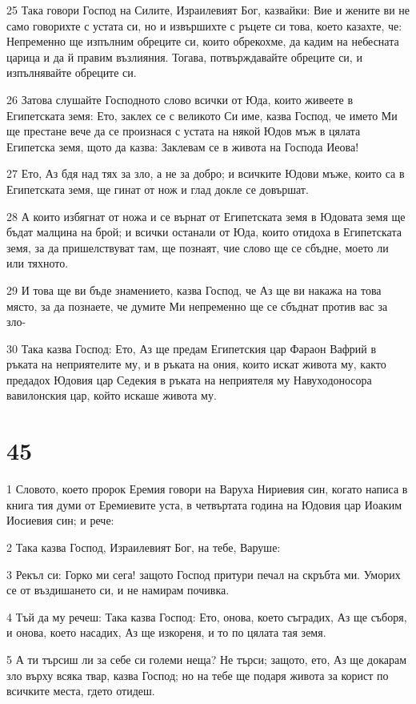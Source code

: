 \par 25 Така говори Господ на Силите, Израилевият Бог, казвайки: Вие и жените ви не само говорихте с устата си, но и извършихте с ръцете си това, което казахте, че: Непременно ще изпълним обреците си, които обрекохме, да кадим на небесната царица и да й правим възлияния. Тогава, потвърждавайте обреците си, и изпълнявайте обреците си.
\par 26 Затова слушайте Господното слово всички от Юда, които живеете в Египетската земя: Ето, заклех се с великото Си име, казва Господ, че името Ми ще престане вече да се произнася с устата на някой Юдов мъж в цялата Египетска земя, щото да казва: Заклевам се в живота на Господа Иеова!
\par 27 Ето, Аз бдя над тях за зло, а не за добро; и всичките Юдови мъже, които са в Египетската земя, ще гинат от нож и глад докле се довършат.
\par 28 А които избягнат от ножа и се върнат от Египетската земя в Юдовата земя ще бъдат малцина на брой; и всички останали от Юда, които отидоха в Египетската земя, за да пришелствуват там, ще познаят, чие слово ще се сбъдне, моето ли или тяхното.
\par 29 И това ще ви бъде знамението, казва Господ, че Аз ще ви накажа на това място, за да познаете, че думите Ми непременно ще се сбъднат против вас за зло-
\par 30 Така казва Господ: Ето, Аз ще предам Египетския цар Фараон Вафрий в ръката на неприятелите му, и в ръката на ония, които искат живота му, както предадох Юдовия цар Седекия в ръката на неприятеля му Навуходоносора вавилонския цар, който искаше живота му.

\chapter{45}

\par 1 Словото, което пророк Еремия говори на Варуха Нириевия син, когато написа в книга тия думи от Еремиевите уста, в четвъртата година на Юдовия цар Иоаким Иосиевия син; и рече:
\par 2 Така казва Господ, Израилевият Бог, на тебе, Варуше:
\par 3 Рекъл си: Горко ми сега! защото Господ притури печал на скръбта ми. Уморих се от въздишането си, и не намирам почивка.
\par 4 Тъй да му речеш: Така казва Господ: Ето, онова, което съградих, Аз ще съборя, и онова, което насадих, Аз ще изкореня, и то по цялата тая земя.
\par 5 А ти търсиш ли за себе си големи неща? Не търси; защото, ето, Аз ще докарам зло върху всяка твар, казва Господ; но на тебе ще подаря живота за корист по всичките места, гдето отидеш.

